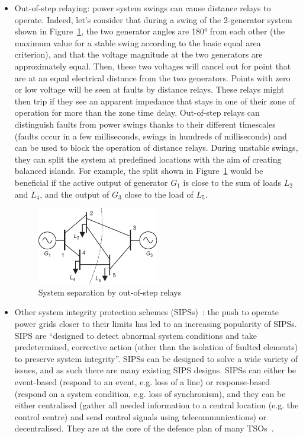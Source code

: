 \begin{itemize}
\begin{itemize}
        \item Out-of-step relaying: power system swings can cause distance relays to operate. Indeed, let's consider that during a swing of the 2-generator system shown in Figure~\ref{fig:OOS}, the two generator angles are 180° from each other (the maximum value for a stable swing according to the basic equal area criterion), and that the voltage magnitude at the two generators are approximately equal. Then, these two voltages will cancel out for point that are at an equal electrical distance from the two generators. Points with zero or low voltage will be seen at faults by distance relays. These relays might then trip if they see an apparent impedance that stays in one of their zone of operation for more than the zone time delay. Out-of-step relays can distinguish faults from power swings thanks to their different timescales (faults occur in a few milliseconds, swings in hundreds of milliseconds) and can be used to block the operation of distance relays. During unstable swings, they can split the system at predefined locations with the aim of creating balanced islands. For example, the split shown in Figure~\ref{fig:OOS} would be beneficial if the active output of generator \(G_1\) is close to the sum of loads \(L_2\) and \(L_4\), and the output of \(G_3\) close to the load of \(L_5\).
        \begin{figure}
            \centering
            \includegraphics[width = 0.5\textwidth]{Figs/Out_of_step.pdf}
            \caption{System separation by out-of-step relays~\cite{HorowitzBook}}
            \label{fig:OOS}
        \end{figure}
        \item Other system integrity protection schemes (SIPSs)~\cite{IEEE_SIPS, CIGRE_SIPS_tutorial}: the push to operate power grids closer to their limits has led to an increasing popularity of SIPSs. SIPS are ``designed to detect abnormal system conditions and take predetermined, corrective action (other than the isolation of faulted elements) to preserve system integrity''. SIPSs can be designed to solve a wide variety of issues, and as such there are many existing SIPS designs. SIPSs can either be event-based (respond to an event, e.g. loss of a line) or response-based (respond on a system condition, e.g. loss of synchronism), and they can be either centralised (gather all needed information to a central location (e.g. the control centre) and send control signals using telecommunications) or decentralised. They are at the core of the defence plan of many TSOs~\cite{CigreDefensePlan, ENTSOEdefencePlan}.
    \end{itemize}
\end{itemize}



